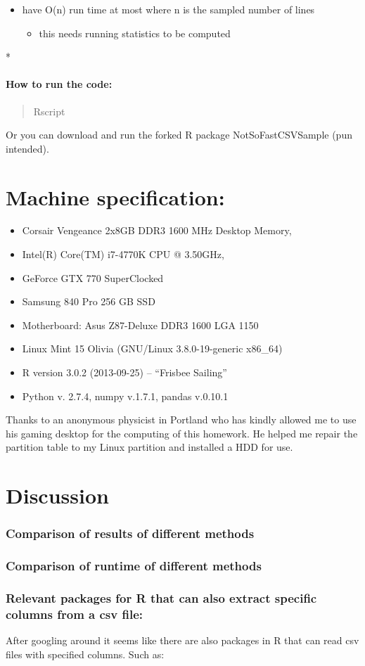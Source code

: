 \documentclass[letterpaper,10pt,english]{/usr/local/lib/python2.7/dist-packages/sphinx/texinputs/sphinxhowto}
\begin{document}
\begin{itemize}
\itemsep1pt\parskip0pt
\item
  have O(n) run time at most where n is the sampled number of lines

  \begin{itemize}
  \itemsep1pt\parskip0pt
  \item
    this needs running statistics to be computed\\
  \end{itemize}
\end{itemize}

*\subsection{How to run the code:}\begin{quote}
Rscript
\end{quote}Or you can download and run the forked R package NotSoFastCSVSample (pun
intended).\part{Machine specification:}\begin{itemize}
\itemsep1pt\parskip0pt
\item
  Corsair Vengeance 2x8GB DDR3 1600 MHz Desktop Memory,
\item
  Intel(R) Core(TM) i7-4770K CPU @ 3.50GHz, 
\item
  GeForce GTX 770 SuperClocked
\item
  Samsung 840 Pro 256 GB SSD
\item
  Motherboard: Asus Z87-Deluxe DDR3 1600 LGA 1150
\item
  Linux Mint 15 Olivia (GNU/Linux 3.8.0-19-generic x86\_64)
\item
  R version 3.0.2 (2013-09-25) -- ``Frisbee Sailing''
\item
  Python v. 2.7.4, numpy v.1.7.1, pandas v.0.10.1
\end{itemize}

Thanks to an anonymous physicist in Portland who has kindly allowed me
to use his gaming desktop for the computing of this homework. He helped
me repair the partition table to my Linux partition and installed a HDD
for use.\part{Discussion}\section{Comparison of results of different methods}\section{Comparison of runtime of different methods}\section{Relevant packages for R that can also extract specific columns from a
csv file:}After googling around it seems like there are also packages in R that
can read csv files with specified columns. Such as:
\end{document}
